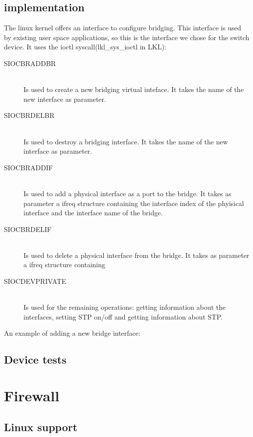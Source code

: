 \subsection{\text{\project} implementation}
\label{sub-sec:switch-lkl}

The linux kernel offers an interface to configure bridging. This interface is used
by existing user space applications, so this is the interface we chose for the switch device. 
It uses the ioctl syscall(lkl_sys_ioctl in LKL):
\begin{description}
  \item[SIOCBRADDBR] \hfill \\
  Is used to create a new bridging virtual inteface. It takes the name of the new interface as parameter.
  \item[SIOCBRDELBR] \hfill \\
  Is used to destroy a bridging interface. It takes the name of the new interface as parameter.
  \item[SIOCBRADDIF] \hfill \\
  Is used to add a physical interface as a port to the bridge. It takes as parameter a ifreq structure containing
the interface index of the phyisical interface and the interface name of the bridge.
  \item[SIOCBRDELIF] \hfill \\
  Is used to delete a physical interface from the bridge. It takes as parameter a ifreq structure containing
  \item[SIOCDEVPRIVATE] \hfill \\
  Is used for the remaining operations: getting information about the interfaces, setting STP on/off and getting information
about STP.
\end{description}
An example of adding a new bridge interface:

\lstset{language=C,caption=Add bridge,label=lst:cbridgeadd}


\subsection{Device tests}
\label{sub-sec:switch-tests}

\section{Firewall}
\label{sub-sec:firewall-impl}

\subsection{Linux support}
\label{sub-sec:firewall-lin}

